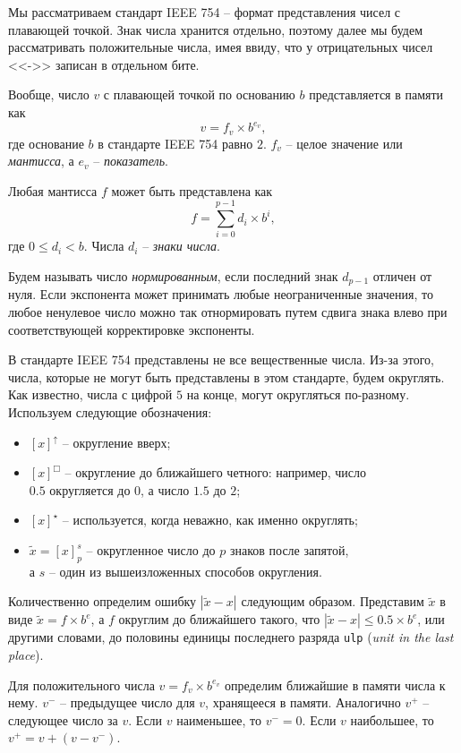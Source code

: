 Мы рассматриваем стандарт \textsf{IEEE 754} -- формат представления чисел с плавающей точкой.
Знак числа хранится отдельно, поэтому далее мы будем рассматривать положительные числа, имея ввиду, что у отрицательных чисел <<->> записан в отдельном бите.

Вообще, число $v$ с плавающей точкой по основанию $b$ представляется в памяти как $$v = f_v \times b^{e_v},$$ где основание $b$ в стандарте \textsf{IEEE 754} равно $2$. $f_v$ -- целое значение или \textit{мантисса}, а $e_v$ -- \textit{показатель}.

Любая мантисса $f$ может быть представлена как $$f = \sum\limits_{i=0}^{p-1} d_i \times b^i,$$ где $0 \leqslant d_i < b$. 
Числа $d_i$ -- \textit{знаки числа}.

Будем называть число \textit{нормированным}, если последний знак $d_{p-1}$ отличен от нуля.
Если экспонента может принимать любые неограниченные значения, то любое ненулевое число можно так отнормировать путем сдвига знака влево при соответствующей корректировке экспоненты. 

В стандарте \textsf{IEEE 754} представлены не все вещественные числа. 
Из-за этого, числа, которые не могут быть представлены в этом стандарте, будем округлять.
Как известно, числа с цифрой $5$ на конце, могут округляться по-разному.
Используем следующие обозначения:
\begin{itemize}
\item $[x]^\uparrow$ -- округление вверх;
\item $[x]^\Box$ -- округление до ближайшего четного: например, число \\$0.5$ округляется до $0$, а число $1.5$ до $2$;
\item $[x]^\star$ -- используется, когда неважно, как именно округлять;
\item $\tilde x = \left[ x \right]_p^s$ -- округленное число до $p$ знаков после запятой,\\ а $s$ -- один из вышеизложенных способов округления.
\end{itemize}

Количественно определим ошибку $|\tilde x - x|$ следующим образом.
Представим $\tilde x$ в виде $\tilde x=f \times b^e$, а $f$ округлим до ближайшего такого, что $|\tilde x - x| \leqslant 0.5 \times b^e$, или другими словами, до половины единицы последнего разряда \texttt{ulp} (\textit{unit in the last place}).

Для положительного числа $v=f_v \times b^{e_v}$ определим ближайшие в памяти числа к нему.
$v^{-}$ -- предыдущее число для $v$, хранящееся в памяти.
Аналогично $v^{+}$ -- следующее число за $v$.
Если $v$ наименьшее, то $v^{-} = 0$.
Если $v$ наибольшее, то $v^{+} = v + (v - v^{-})$.

